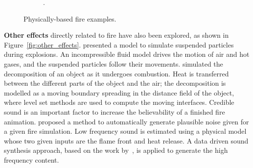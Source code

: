 \begin{figure}[htb!]
\begin{subfigure}[t]{0.3\textwidth}
                \caption{\cite{Hong:2007}.}
        \end{subfigure} 
        \caption{Physically-based fire examples.}
        \label{fig:physically_based}
\end{figure}
 
\textbf{Other effects} directly related to fire have also been explored, as shown in Figure~\ref{fig:other_effects}.
\cite{Feldman:2003} presented a model to simulate suspended particles during explosions.
An incompressible fluid model drives the motion of air and hot gases, and the suspended particles follow their movements.
\cite{Melek:2005} simulated the decomposition of an object as it undergoes combustion.
Heat is transferred between the different parts of the object and the air; the decomposition is modelled as a moving boundary spreading in the distance field of the object, where level set methods are used to compute the moving interfaces.
Credible sound is an important factor to increase the believability of a finished fire animation.
\cite{Chadwick:2011} proposed a method to automatically generate plausible noise given for a given fire simulation.
Low frequency sound is estimated using a physical model whose two given inputs are the flame front and heat release.
A data driven sound synthesis approach, based on the work by~\cite{Wei:2000}, is applied to generate the high frequency content.

